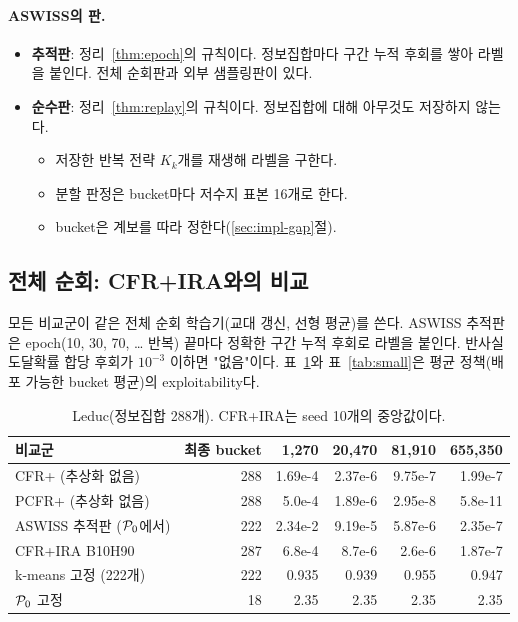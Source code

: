 \paragraph{ASWISS의 판.}
\begin{itemize}
  \item \textbf{추적판}: 정리~\ref{thm:epoch}의 규칙이다. 정보집합마다 구간 누적 후회를 쌓아 라벨을 붙인다. 전체 순회판과 외부 샘플링판이 있다.
  \item \textbf{순수판}: 정리~\ref{thm:replay}의 규칙이다. 정보집합에 대해 아무것도 저장하지 않는다.
    \begin{itemize}
      \item 저장한 반복 전략 $K_k$개를 재생해 라벨을 구한다.
      \item 분할 판정은 bucket마다 저수지 표본 16개로 한다.
      \item bucket은 계보를 따라 정한다(\ref{sec:impl-gap}절).
    \end{itemize}
\end{itemize}

\subsection{전체 순회: CFR+IRA와의 비교}\label{sec:exp-ira}
모든 비교군이 같은 전체 순회 학습기(교대 갱신, 선형 평균)를 쓴다.
ASWISS 추적판은 epoch(10, 30, 70, … 반복) 끝마다 정확한 구간 누적 후회로 라벨을 붙인다. 반사실 도달확률 합당 후회가 $10^{-3}$ 이하면 "없음"이다.
표~\ref{tab:leduc}와 표~\ref{tab:small}은 평균 정책(배포 가능한 bucket 평균)의 exploitability다.

\begin{table}[h]
\centering\small
\caption{Leduc(정보집합 288개). CFR+IRA는 seed 10개의 중앙값이다.}\label{tab:leduc}
\begin{tabular}{@{}lrrrrr@{}}
\toprule
비교군 & 최종 bucket & 1,270 & 20,470 & 81,910 & 655,350 \\
\midrule
CFR+ (추상화 없음) & 288 & 1.69e-4 & 2.37e-6 & 9.75e-7 & 1.99e-7 \\
PCFR+ (추상화 없음) & 288 & 5.0e-4 & 1.89e-6 & 2.95e-8 & 5.8e-11 \\
ASWISS 추적판 ($\mathcal{P}_0$에서) & 222 & 2.34e-2 & 9.19e-5 & 5.87e-6 & 2.35e-7 \\
CFR+IRA B10H90 & 287 & 6.8e-4 & 8.7e-6 & 2.6e-6 & 1.87e-7 \\
k-means 고정 (222개) & 222 & 0.935 & 0.939 & 0.955 & 0.947 \\
$\mathcal{P}_0$ 고정 & 18 & 2.35 & 2.35 & 2.35 & 2.35 \\
\bottomrule
\end{tabular}
\end{table}

